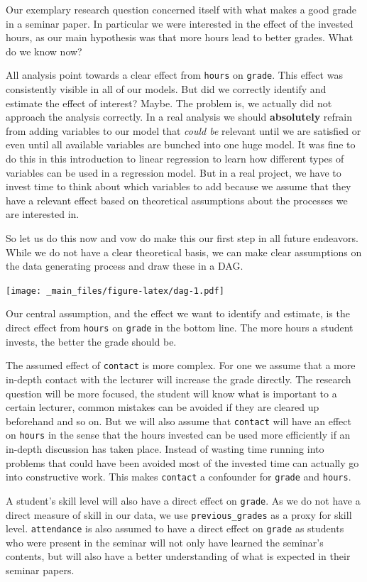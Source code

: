 \documentclass[
]{book}
\begin{document}
Our exemplary research question concerned itself with what makes a good grade in
a seminar paper. In particular we were interested in the effect of the invested
hours, as our main hypothesis was that more hours lead to better grades. What do
we know now?

All analysis point towards a clear effect from \texttt{hours} on \texttt{grade}. This effect
was consistently visible in all of our models. But did we correctly identify
and estimate the effect of interest? Maybe. The problem is, we actually did not
approach the analysis correctly. In a real analysis we should \textbf{absolutely}
refrain from adding variables to our model that \emph{could be} relevant until we are
satisfied or even until all available variables are bunched into one huge model.
It was fine to do this in this introduction to linear regression to learn how
different types of variables can be used in a regression model. But in a real
project, we have to invest time to think about which variables to add because we
assume that they have a relevant effect based on theoretical assumptions about
the processes we are interested in.

So let us do this now and vow do make this our first step in all future
endeavors. While we do not have a clear theoretical basis, we can make clear
assumptions on the data generating process and draw these in a DAG.

\texttt{[image: \_main\_files/figure-latex/dag-1.pdf]}

Our central assumption, and the effect we want to identify and estimate, is the
direct effect from \texttt{hours} on \texttt{grade} in the bottom line. The more hours a
student invests, the better the grade should be.

The assumed effect of \texttt{contact} is more complex. For one we assume that a more
in-depth contact with the lecturer will increase the grade directly. The
research question will be more focused, the student will know what is important
to a certain lecturer, common mistakes can be avoided if they are cleared up
beforehand and so on. But we will also assume that \texttt{contact} will have an effect
on \texttt{hours} in the sense that the hours invested can be used more efficiently if
an in-depth discussion has taken place. Instead of wasting time running into
problems that could have been avoided most of the invested time can actually go
into constructive work. This makes \texttt{contact} a confounder for \texttt{grade} and
\texttt{hours}.

A student's skill level will also have a direct effect on \texttt{grade}. As we do not
have a direct measure of skill in our data, we use \texttt{previous\_grades} as a proxy
for skill level. \texttt{attendance} is also assumed to have a direct effect on \texttt{grade}
as students who were present in the seminar will not only have learned the seminar's
contents, but will also have a better understanding of what is expected in their
seminar papers.
\end{document}
